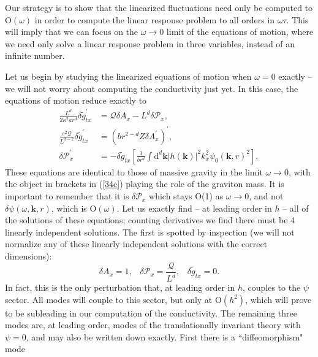 \documentclass[10pt, oneside]{book}
\begin{document}
\begin{doublespace}
Our strategy is to show that the linearized fluctuations need only be computed to $\mathrm{O}(\omega)$ in order to compute the linear response problem to all orders in $\omega\tau$.   This will imply that we can focus on the $\omega\rightarrow 0$ limit of the equations of motion, where we need only solve a linear response problem in three variables, instead of an infinite number.   

Let us begin by studying  the linearized equations of motion when $\omega=0$ exactly -- we will not worry about computing the conductivity just yet.  In this case, the equations of motion reduce exactly to \begin{subequations}\label{eq34}\begin{align}
\frac{L^d}{2\kappa^2 ar^d} \delta\tilde{g}^\prime_{tx} &= \mathcal{Q}\delta A_x - L^d \delta \mathcal{P}_x,  \label{50a} \\
\frac{e^2 \mathcal{Q}}{L^{d-2}}\delta \tilde{g}_{tx}^\prime &=  \left(br^{2-d}Z\delta A_x^\prime \right)^\prime, \label{50b} \\
\delta \mathcal{P}_x^\prime &= -\delta\tilde{g}_{tx}\left[\frac{1}{br^d}\int\mathrm{d}^d\mathbf{k} |h(\mathbf{k})|^2 k_x^2\psi_0(\mathbf{k},r)^2\right],  \label{34c}
\end{align}\end{subequations}
These equations are identical to those of massive gravity \cite{Blake:2013bqa} in the limit $\omega\rightarrow 0$, with the object in brackets in (\ref{34c}) playing the role of the graviton mass.  It is important to remember that it is $\delta \mathcal{P}_x$ which stays O(1) as $\omega\rightarrow 0$, and not $\delta \psi(\omega,\mathbf{k},r)$, which is $\mathrm{O}(\omega)$.   Let us exactly find -- at leading order in $h$ -- all of the solutions of these equations;  counting derivatives we find there must be 4 linearly independent solutions.   The first is spotted by inspection (we will not normalize any of these linearly independent solutions with the correct dimensions): \begin{equation}
\delta A_x = 1, \;\;\; \delta \mathcal{P}_x = \frac{\mathcal{Q}}{L^d}, \;\;\; \delta\tilde{g}_{tx} = 0.
\end{equation}   
In fact, this is the only perturbation that, at leading order in $h$, couples to the $\psi$ sector.    All modes will couple to this sector, but only at $\mathrm{O}(h^2)$, which will prove to be subleading in our computation of the conductivity.   The remaining three modes are, at leading order, modes of the translationally invariant theory with $\psi=0$, and may also be written down exactly.   First there is a ``diffeomorphism" mode \begin{equation}

\end{equation}
\end{doublespace}
\end{document}
